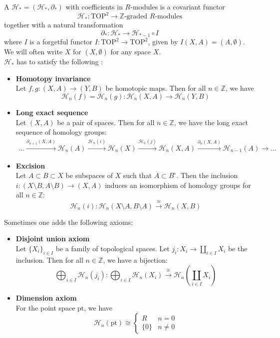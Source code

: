 \documentclass[a4paper,11pt]{article}
\begin{document}
\begin{definition}
    A  \(\mathcal{H}_\ast=(\mathcal{H}_\ast,\partial_\ast)\) with coefficients in \(R\)-modules is a covariant functor\[\mathcal{H}_\ast:\mathrm{TOP}^2\to\mathbb{Z}\text{-graded }R\text{-modules}\]
    together with a natural transformation 
    \[\partial_\ast:\mathcal{H}_\ast\to\mathcal{H}_{\ast-1}\circ I\]
    where \(I\) is a forgetful functor \(I:\mathrm{TOP}^2\to\mathrm{TOP}^2\), given by \(I(X,A)=(A,\emptyset)\). We will often write \(X\) for \((X,\emptyset)\) for any space \(X\).\\
    \(\mathcal{H}_\ast\) has to satisfy the following :
    \begin{itemize}
        \item \textbf{Homotopy invariance}\\
        Let \(f,g:(X,A)\to(Y,B)\) be homotopic maps. Then for all \(n\in\mathbb{Z}\), we have
        \[\mathcal{H}_n(f)=\mathcal{H}_n(g):\mathcal{H}_n(X,A)\to\mathcal{H}_n(Y,B)\]
        \item \textbf{Long exact sequence}\\
        Let \((X,A)\) be a pair of spaces. Then for all \(n\in\mathbb{Z}\), we have the long exact sequence of homology groups:
        \begin{align*}
            \dots\xrightarrow{\partial_{n+1}(X,A)}\mathcal{H}_n(A)\xrightarrow{\mathcal{H}_n(i)}\mathcal{H}_n(X)\xrightarrow{\mathcal{H}_n(j)}\mathcal{H}_n(X,A)\xrightarrow{\partial_n(X,A)}\mathcal{H}_{n-1}(A)\to\dots
        \end{align*}
        \item \textbf{Excision}\\
        Let \(A\subset B\subset X\) be subspaces of \(X\) such that \(\overline{A}\subset B^\circ\). Then the inclusion \(i:(X\setminus B,A\setminus B)\to(X,A)\) induces an isomorphism of homology groups for all \(n\in\mathbb{Z}\):
        \[\mathcal{H}_n(i):\mathcal{H}_n(X\setminus A, B\setminus A)\xrightarrow{\cong}\mathcal{H}_n(X,B)\]
    \end{itemize}
    Sometimes one adds the following axioms:
    \begin{itemize}
        \item \textbf{Disjoint union axiom}\\
        Let \({\{X_i\}}_{i\in I}\) be a family of topological spaces. Let \(j_i:X_i\to\coprod_{i\in I}X_i\) be the inclusion. Then for all \(n\in\mathbb{Z}\), we have a bijection:
        \[\bigoplus_{i\in I}\mathcal{H}_n(j_i):\bigoplus_{i\in I}\mathcal{H}_n(X_i)\xrightarrow{\cong}\mathcal{H}_n\left(\coprod_{i\in I}X_i\right)\]
        \item \textbf{Dimension axiom}\\
        For the point space \(\mathrm{pt}\), we have
        \[\mathcal{H}_n(\mathrm{pt})\cong\begin{cases}R&n=0\\\{0\}&n\neq0\end{cases}\]
        

\end{itemize}
\end{definition}
\end{document}
